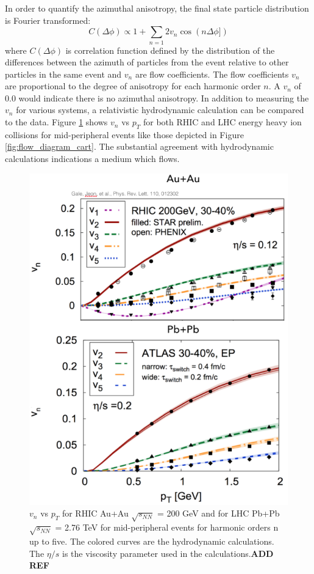 In order to quantify the azimuthal anisotropy, the final state particle distribution is Fourier transformed:
\begin{equation}\label{eqn:dndphi}
  C(\Delta\phi) \propto 1 + \sum_{n=1}2 v_{n}\cos(n\Delta\phi]) 
\end{equation}
where $C(\Delta\phi)$ is correlation function defined by the distribution of the differences between the azimuth of particles from the event relative to other particles in the same event and $v_n$ are flow coefficients. The flow coefficients $v_n$ are proportional to the degree of anisotropy for each harmonic order $n$. A $v_n$ of 0.0 would indicate there is no azimuthal anisotropy. In addition to measuring the $v_n$ for various systems, a relativistic hydrodynamic calculation can be compared to the data. Figure \ref{fig:vn_aa_hydro} shows $v_n$ vs $p_T$ for both RHIC and LHC energy heavy ion collisions for mid-peripheral events like those depicted in Figure \ref{fig:flow_diagram_cart}. The substantial agreement with hydrodynamic calculations indications a medium which flows.

\begin{figure}[!ht]
\begin{center}
\includegraphics[width=0.65\linewidth]{figs/vn_aa_pbpb_hydro.PNG}
\caption{$v_n$ vs $p_T$ for RHIC Au+Au $\sqrt{s_{NN}}$ = 200 GeV and for LHC Pb+Pb $\sqrt{s_{NN}}$ = 2.76 TeV for mid-peripheral events for harmonic orders n up to five. The colored curves are the hydrodynamic calculations. The $\eta/s$ is the viscosity parameter used in the calculations.\textbf{ADD REF}}
\end{center}
\label{fig:vn_aa_hydro}
\end{figure}

